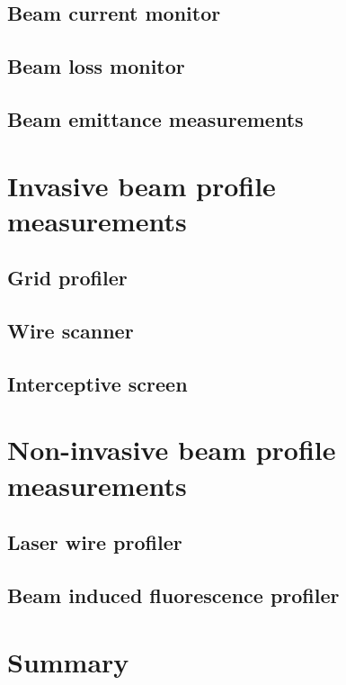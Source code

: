 \begin{refsection}
	\subsection{Beam current monitor}
	\subsection{Beam loss monitor}
	\subsection{Beam emittance measurements}
	\section{Invasive beam profile measurements}
	\subsection{Grid profiler}
	\subsection{Wire scanner}
	\subsection{Interceptive screen}
	\section{Non-invasive beam profile measurements}
	\subsection{Laser wire profiler}
	\subsection{Beam induced fluorescence profiler}
	\section{Summary}
	\label{ch2:Summary}
	\printbibliography[heading=subbibliography]
\end{refsection}